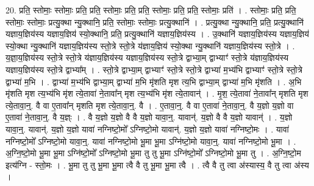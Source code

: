 \documentclass[17pt]{extarticle}
\begin{document}
20. प्रति॒ स्तोमाः॒ स्तोमाः॒ प्रति॒ प्रति॒ स्तोमाः॒ प्रति॒ प्रति॒ स्तोमाः॒ प्रति॒ प्रति॒ स्तोमाः॒ प्रति॑ । . स्तोमाः॒ प्रति॒ प्रति॒ स्तोमाः॒ स्तोमाः॒ प्रत्यु॒क्था न्यु॒क्थानि॒ प्रति॒ स्तोमाः॒ स्तोमाः॒ प्रत्यु॒क्थानि॑ । . प्रत्यु॒क्था न्यु॒क्थानि॒ प्रति॒ प्रत्यु॒क्थानि॑ यज्ञाय॒ज्ञिय॑स्य यज्ञाय॒ज्ञिय॑ स्यो॒क्थानि॒ प्रति॒ प्रत्यु॒क्थानि॑ यज्ञाय॒ज्ञिय॑स्य । . उ॒क्थानि॑ यज्ञाय॒ज्ञिय॑स्य यज्ञाय॒ज्ञिय॑ स्यो॒क्था न्यु॒क्थानि॑ यज्ञाय॒ज्ञिय॑स्य स्तो॒त्रे स्तो॒त्रे य॑ज्ञाय॒ज्ञिय॑ स्यो॒क्था न्यु॒क्थानि॑ यज्ञाय॒ज्ञिय॑स्य स्तो॒त्रे । . य॒ज्ञा॒य॒ज्ञिय॑स्य स्तो॒त्रे स्तो॒त्रे य॑ज्ञाय॒ज्ञिय॑स्य यज्ञाय॒ज्ञिय॑स्य स्तो॒त्रे द्वाभ्या॒म् द्वाभ्याꣳ॑ स्तो॒त्रे य॑ज्ञाय॒ज्ञिय॑स्य यज्ञाय॒ज्ञिय॑स्य स्तो॒त्रे द्वाभ्या᳚म् । . स्तो॒त्रे द्वाभ्या॒म् द्वाभ्याꣳ॑ स्तो॒त्रे स्तो॒त्रे द्वाभ्या॑ म॒भ्य॑भि द्वाभ्याꣳ॑ स्तो॒त्रे स्तो॒त्रे द्वाभ्या॑ म॒भि । . द्वाभ्या॑ म॒भ्य॑भि द्वाभ्या॒म् द्वाभ्या॑ म॒भि मृ॑शति मृश त्य॒भि द्वाभ्या॒म् द्वाभ्या॑ म॒भि मृ॑शति । . अ॒भि मृ॑शति मृश त्य॒भ्य॑भि मृ॑श त्ये॒तावा॑ ने॒तावा᳚न् मृश त्य॒भ्य॑भि मृ॑श त्ये॒तावान्॑ । . मृ॒श॒ त्ये॒तावा॑ ने॒तावा᳚न् मृशति मृश त्ये॒तावा॒न्॒. वै वा ए॒तावा᳚न् मृशति मृश त्ये॒तावा॒न्॒. वै । . ए॒तावा॒न्॒. वै वा ए॒तावा॑ ने॒तावा॒न्॒. वै य॒ज्ञो य॒ज्ञो वा ए॒तावा॑ ने॒तावा॒न्॒. वै य॒ज्ञ्ः । . वै य॒ज्ञो य॒ज्ञो वै वै य॒ज्ञो यावा॒न्॒. यावान्॑. य॒ज्ञो वै वै य॒ज्ञो यावान्॑ । . य॒ज्ञो यावा॒न्॒. यावान्॑. य॒ज्ञो य॒ज्ञो यावा॑ नग्निष्टो॒मो᳚ ऽग्निष्टो॒मो यावान्॑. य॒ज्ञो य॒ज्ञो यावा॑ नग्निष्टो॒मः । . यावा॑ नग्निष्टो॒मो᳚ ऽग्निष्टो॒मो यावा॒न्॒. यावा॑ नग्निष्टो॒मो भू॒मा भू॒मा ऽग्नि॑ष्टो॒मो यावा॒न्॒. यावा॑ नग्निष्टो॒मो भू॒मा । . अ॒ग्नि॒ष्टो॒मो भू॒मा भू॒मा ऽग्नि॑ष्टो॒मो᳚ ऽग्निष्टो॒मो भू॒मा तु तु भू॒मा ऽग्नि॑ष्टो॒मो᳚ ऽग्निष्टो॒मो भू॒मा तु । . अ॒ग्नि॒ष्टो॒म इत्य॑ग्नि - स्तो॒मः । . भू॒मा तु तु भू॒मा भू॒मा त्वै वै तु भू॒मा भू॒मा त्वै । . त्वै वै तु त्वा अ॑स्यास्य॒ वै तु त्वा अ॑स्य । \newline
\end{document}
